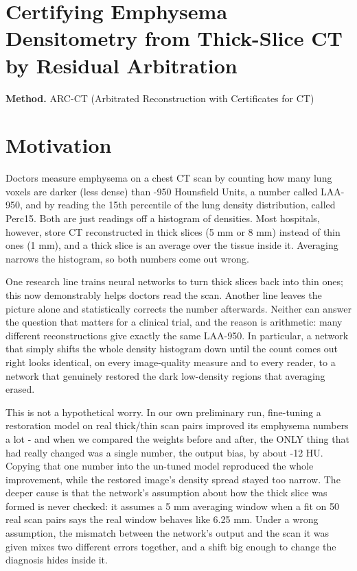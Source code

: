 \documentclass[10pt,a4paper]{article}
\begin{document}
\section*{Certifying Emphysema Densitometry from Thick-Slice CT by Residual Arbitration}
\textbf{Method.} ARC-CT (Arbitrated Reconstruction with Certificates for CT)
\section*{Motivation}
Doctors measure emphysema on a chest CT scan by counting how many lung voxels are darker (less dense) than -950 Hounsfield Units, a number called LAA-950, and by reading the 15th percentile of the lung density distribution, called Perc15. Both are just readings off a histogram of densities. Most hospitals, however, store CT reconstructed in thick slices (5 mm or 8 mm) instead of thin ones (1 mm), and a thick slice is an average over the tissue inside it. Averaging narrows the histogram, so both numbers come out wrong.

One research line trains neural networks to turn thick slices back into thin ones;\allowbreak{} this now demonstrably helps doctors read the scan. Another line leaves the picture alone and statistically corrects the number afterwards. Neither can answer the question that matters for a clinical trial, and the reason is arithmetic: many different reconstructions give exactly the same LAA-950. In particular, a network that simply shifts the whole density histogram down until the count comes out right looks identical, on every image-quality measure and to every reader, to a network that genuinely restored the dark low-density regions that averaging erased.

This is not a hypothetical worry. In our own preliminary run, fine-tuning a restoration model on real thick/thin scan pairs improved its emphysema numbers a lot - and when we compared the weights before and after, the ONLY thing that had really changed was a single number, the output bias, by about -12 HU. Copying that one number into the un-tuned model reproduced the whole improvement, while the restored image's density spread stayed too narrow. The deeper cause is that the network's assumption about how the thick slice was formed is never checked: it assumes a 5 mm averaging window when a fit on 50 real scan pairs says the real window behaves like 6.25 mm. Under a wrong assumption, the mismatch between the network's output and the scan it was given mixes two different errors together, and a shift big enough to change the diagnosis hides inside it.
\end{document}
